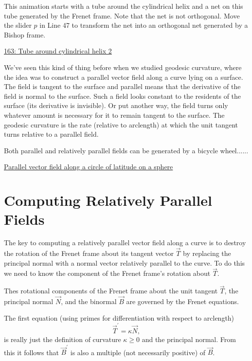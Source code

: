 \documentclass{ximera}
\begin{document}
\begin{exploration}
This animation starts with a tube around the cylindrical helix and a net on this tube generated by the Frenet frame. Note that the net is not orthogonal. Move the slider $p$ in Line 47 to transform the net into an orthogonal net generated by a Bishop frame.

\href{https://www.desmos.com/3d/agzievbron}{163: Tube around cylindrical helix 2}
\end{exploration}

We've seen this kind of thing before when we studied geodesic curvature, where the idea was to construct a parallel vector field along a curve lying on a surface. The field is tangent to the surface and parallel means that the derivative of the field is normal to the surface. Such a field looks constant to the residents of the surface (its derivative is invisible). Or put another way, the field turns only whatever amount is necessary for it to remain tangent to the surface. The geodesic curvature is the rate (relative to arclength) at which the unit tangent turns relative to a parallel field.

Both parallel and relatively parallel fields can be generated by a bicycle wheel......

\begin{exploration}
\href{https://www.desmos.com/3d/frbiiccyfd}{Parallel vector field along a circle of latitude on a sphere}
\end{exploration}




\section*{Computing Relatively Parallel Fields}

The key to computing a relatively parallel vector field along a curve is to destroy the rotation of the Frenet frame about its tangent vector $\overrightarrow{T}$ by replacing the principal normal with a normal vector relatively parallel to the curve. To do this we need to know the component of the Frenet frame's rotation about $\overrightarrow{T}$.

Thes rotational components of the Frenet frame about the unit tangent $\overrightarrow{T}$, the principal normal $\overrightarrow{N}$, and the binormal $\overrightarrow{B}$ are governed by the Frenet equations. 

The first equation (using primes for differentiation with respect to arclength)
\begin{equation}
       \overrightarrow{T}^\prime = \kappa \overrightarrow{N} ,   \label{Eq:Curvature}
\end{equation}
is really just the definition of curvature $\kappa \geq 0$ and the principal normal. From this it follows that $\overrightarrow{B}^\prime$ is also a multiple (not necessarily positive) of $\overrightarrow{B}$. 
\end{document}
